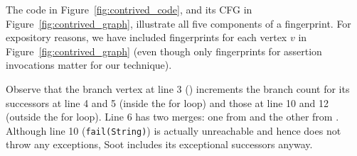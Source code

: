 The code in Figure~\ref{fig:contrived_code}, and its CFG in
Figure~\ref{fig:contrived_graph}, 
illustrate all five components of a fingerprint. For expository reasons, we have included fingerprints for each vertex $v$ in Figure~\ref{fig:contrived_graph} (even though only fingerprints for assertion invocations matter for our technique).

Observe that
the branch vertex at line 3 () increments the branch count for its successors at line 4 and 5 (inside the for loop) and those at line 10 and 12 (outside the for loop).
Line 6 has two merges: one from  and the other from .
Although line 10 ({\tt fail(String)}) is actually unreachable and hence does not throw any exceptions, Soot includes its exceptional successors anyway.




